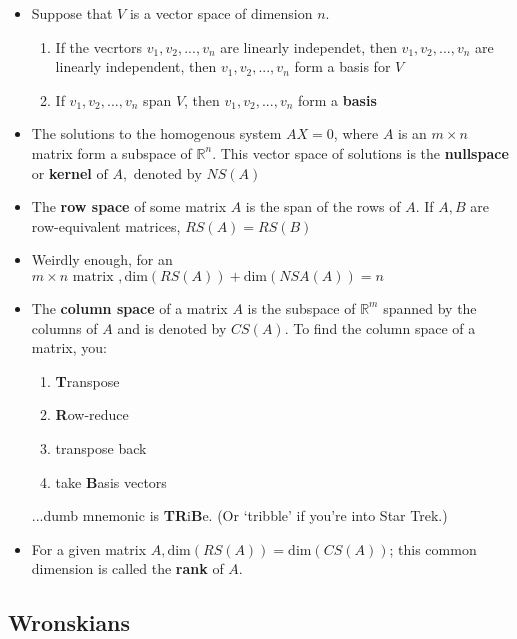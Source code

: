 \documentclass[10pt,letterpaper]{article}
\begin{document}
\begin{itemize}
\item Suppose that $V$ is a vector space of dimension $n$. 
\begin{enumerate}
\item If the vecrtors $v_1,v_2,...,v_n$ are linearly independet, then $v_1,v_2, ...,v_n$ are linearly independent, then $v_1,v_2, ...,v_n$  form a basis for $V$

\item If $v_1,v_2, ...,v_n$ span $V$, then $v_1,v_2, ...,v_n$ form a \textbf{basis}
\end{enumerate}

\item The solutions to the homogenous system $AX=0$, where $A$ is an $m\times n$ matrix form a subspace of $\mathbb{R}^n$. This vector space of solutions is the \textbf{nullspace} or \textbf{kernel}$\mbox{ of } A, \mbox{ denoted by } NS(A)$

\item The \textbf{row space} of some matrix $A$ is the span of the rows of $A$. If $A, B$ are row-equivalent matrices, $RS(A)=RS(B)$

\item Weirdly enough, for an $m\times n \mbox{ matrix },\mbox{dim}(RS(A))+\mbox{dim}(NSA(A))=n$

\item The \textbf{column space} of a matrix $A$ is the subspace of $\mathbb{R}^m$ spanned by the columns of $A$ and is denoted by $CS(A)$. To find the column space of a matrix, you: 
\begin{enumerate}
\item \textbf{T}ranspose 
\item \textbf{R}ow-reduce
\item transpose back 
\item take \textbf{B}asis vectors 
\end{enumerate}
...dumb mnemonic is \textbf{TR}i\textbf{B}e. (Or `tribble' if you're into Star Trek.) 

\item For a given matrix $A, \mbox{dim}(RS(A)) = \mbox{dim}(CS(A))$; this common dimension is called the \textbf{rank} of $A$. 

\end{itemize}

\subsection*{Wronskians} %
\end{document}
